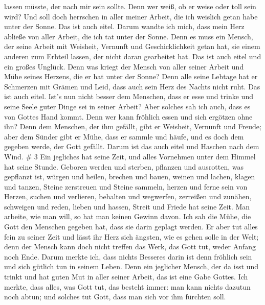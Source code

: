 lassen müsste, der nach mir sein sollte.  Denn wer weiß, ob
er weise oder toll sein wird? Und soll doch herrschen in aller meiner
Arbeit, die ich weislich getan habe unter der Sonne. Das ist auch eitel.
 Darum wandte ich mich, dass mein Herz abließe von aller
Arbeit, die ich tat unter der Sonne.  Denn es muss ein
Mensch, der seine Arbeit mit Weisheit, Vernunft und Geschicklichkeit
getan hat, sie einem anderen zum Erbteil lassen, der nicht daran
gearbeitet hat. Das ist auch eitel und ein großes Unglück. 
Denn was kriegt der Mensch von aller seiner Arbeit und Mühe seines
Herzens, die er hat unter der Sonne?  Denn alle seine
Lebtage hat er Schmerzen mit Grämen und Leid, dass auch sein Herz des
Nachts nicht ruht. Das ist auch eitel.  Ist's nun nicht
besser dem Menschen, dass er esse und trinke und seine Seele guter Dinge
sei in seiner Arbeit? Aber solches sah ich auch, dass es von Gottes Hand
kommt.  Denn wer kann fröhlich essen und sich ergötzen ohne
ihn?  Denn dem Menschen, der ihm gefällt, gibt er Weisheit,
Vernunft und Freude; aber dem Sünder gibt er Mühe, dass er sammle und
häufe, und es doch dem gegeben werde, der Gott gefällt. Darum ist das
auch eitel und Haschen nach dem Wind. \# 3  Ein jegliches
hat seine Zeit, und alles Vornehmen unter dem Himmel hat seine Stunde.
 Geboren werden und sterben, pflanzen und ausrotten, was
gepflanzt ist,  würgen und heilen, brechen und bauen,
 weinen und lachen, klagen und tanzen,  Steine
zerstreuen und Steine sammeln, herzen und ferne sein von Herzen,
 suchen und verlieren, behalten und wegwerfen, 
zerreißen und zunähen, schweigen und reden,  lieben und
hassen, Streit und Friede hat seine Zeit.  Man arbeite, wie
man will, so hat man keinen Gewinn davon.  Ich sah die
Mühe, die Gott den Menschen gegeben hat, dass sie darin geplagt werden.
 Er aber tut alles fein zu seiner Zeit und lässt ihr Herz
sich ängsten, wie es gehen solle in der Welt; denn der Mensch kann doch
nicht treffen das Werk, das Gott tut, weder Anfang noch Ende.
 Darum merkte ich, dass nichts Besseres darin ist denn
fröhlich sein und sich gütlich tun in seinem Leben.  Denn
ein jeglicher Mensch, der da isst und trinkt und hat guten Mut in aller
seiner Arbeit, das ist eine Gabe Gottes.  Ich merkte, dass
alles, was Gott tut, das besteht immer: man kann nichts dazutun noch
abtun; und solches tut Gott, dass man sich vor ihm fürchten soll.
